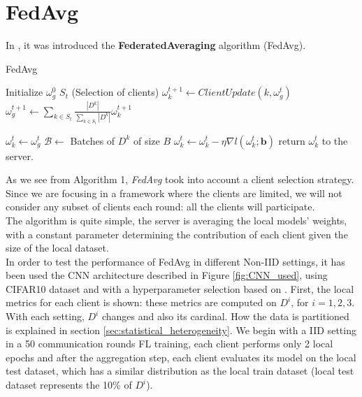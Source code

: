 \section{FedAvg}
In \cite*{mcmahan2023a}, it was introduced the \textbf{FederatedAveraging} algorithm (FedAvg).


\begin{algorithm}[H]
  \caption{FedAvg}
  \label{alg:FedAvg}
  \begin{algorithmic}[1]
    \Statex
    \State Initialize $\omega_g^0$
      \State $S_t$  (Selection of clients)
        \State $\omega_k^{t+1} \gets ClientUpdate(k, \omega_g^t)$
      \EndFor
      \State $\omega_g^{t+1} \gets \sum_{k \in S_t} \frac{|D^k|}{\sum_{k \in S_t} |D^k|} \omega_k^{t+1}$
    \EndFor
    \EndProcedure

    \State $\omega_k^t \gets \omega_g^t$
    \State $\mathcal{B} \gets$ Batches of $D^k$ of size $B$
        \State $\omega_k^t \gets \omega_k^t - \eta \nabla l(\omega_k^t; \mathbf{b})$
      \EndFor
    \EndFor
    \State return $\omega_k^t$ to the server.
    \EndProcedure
  \end{algorithmic}
\end{algorithm}

As we see from Algorithm 1, \textit{FedAvg} took into account a client selection strategy. Since we are focusing in a framework where the clients are limited, we will not consider any subset of clients each round: all the clients will participate.\\
The algorithm is quite simple, the server is averaging the local models' weights, with a constant parameter determining the contribution of each client given the size of the local dataset.\\
In order to test the performance of FedAvg in different Non-IID settings, it has been used the CNN architecture described in Figure \ref{fig:CNN_used}, using CIFAR10 dataset and with a hyperparameter selection based on \cite{li2021}. First, the local metrics for each client is shown: these metrics are computed on $D^i$, for $i=1,2,3$. With each setting, $D^i$ changes and also its cardinal. How the data is partitioned is explained in section \ref{sec:statistical_heterogeneity}.
We begin with a IID setting in a 50 communication rounds FL training, each client performs only 2 local epochs and after the aggregation step, each client evaluates its model on the local test dataset, which has a similar distribution as the local train dataset (local test dataset represents the 10\% of $D^i$).

